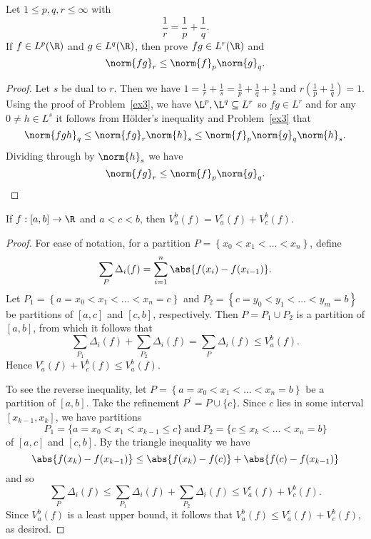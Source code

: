 \documentclass[12pt]{amsart}
\begin{document}
\newpage

\begin{thm}\label{ex5}
  Let $1 \leq p, q, r \leq \infty$ with
  $$\frac{1}{r} = \frac{1}{p} + \frac{1}{q}.$$
  If $f \in L^p(\R)$ and $g \in L^q(\R)$, then prove $fg \in L^r(\R)$ and
  $$\norm{fg}_r \leq \norm{f}_p \norm{g}_q.$$
  
  \begin{proof}
    Let $s$ be dual to $r$.
    Then we have $1 = \frac{1}{r} + \frac{1}{s} = \frac{1}{p} + \frac{1}{q} + \frac{1}{s}$ and $r\left(\frac{1}{p} + \frac{1}{q}\right) = 1$.
    Using the proof of Problem~\ref{ex3}, we have $\L^p, \L^q \subseteq L^r$ so $fg \in L^r$ and for any $0 \neq h \in L^s$ it follows from H\"older's inequality and Problem~\ref{ex3} that
    $$\norm{fgh}_q \leq \norm{fg}_r\norm{h}_s \leq \norm{f}_p\norm{g}_q\norm{h}_s.$$
    Dividing through by $\norm{h}_s$ we have
    $$\norm{fg}_r \leq \norm{f}_p \norm{g}_q.$$
  \end{proof}
\end{thm}

\newpage

\begin{lem}\label{lem1}
  If $f : [a,b] \rightarrow \R$ and $a < c < b$, then $V_a^b(f) = V_a^c(f) + V_c^b(f)$.
  
  \begin{proof}
    For ease of notation, for a partition $P = \left\{x_0 < x_1 < \ldots < x_n\right\}$, define 
    $$\sum_P \Delta_i(f) = \sum_{i = 1}^n \abs{f(x_i) - f(x_{i-1})}.$$
    Let $P_1 = \left\{a = x_0 < x_1 < \ldots < x_n = c\right\}$ and $P_2 = \left\{c = y_0 < y_1 < \ldots < y_m = b\right\}$ be partitions of $[a,c]$ and $[c,b]$, respectively.
    Then $P = P_1 \cup P_2$ is a partition of $[a,b]$, from which it follows that
    $$\sum_{P_1} \Delta_i(f) + \sum_{P_2} \Delta_i(f) = \sum_{P} \Delta_i(f) \leq V_a^b(f).$$
    Hence $V_a^c(f) + V_c^b(f) \leq V_a^b(f)$.
    
    To see the reverse inequality, let $P = \left\{a = x_0 < x_1 < \ldots < x_n = b\right\}$ be a partition of $[a,b]$.
    Take the refinement $P^\prime = P \cup \{c\}$.
    Since $c$ lies in some interval $[x_{k-1}, x_k]$, we have partitions
    $$P_1 = \{a = x_0 < x_1 < x_{k-1} \leq c\}\ \text{and}\ P_2 = \{c \leq x_{k} < \ldots < x_n = b\}$$
    of $[a,c]$ and $[c,b]$.
    By the triangle inequality we have
    $$\abs{f(x_k) - f(x_{k-1})} \leq \abs{f(x_k) - f(c)} + \abs{f(c) - f(x_{k-1})}$$
    and so 
    $$\sum_P \Delta_i(f) \leq \sum_{P_1} \Delta_i(f) + \sum_{P_2} \Delta_i(f) \leq V_a^c(f) + V_c^b(f).$$
    Since $V_a^b(f)$ is a least upper bound, it follows that $V_a^b(f) \leq V_a^c(f) + V_c^b(f)$, as desired.
  \end{proof}
\end{lem}
\end{document}

